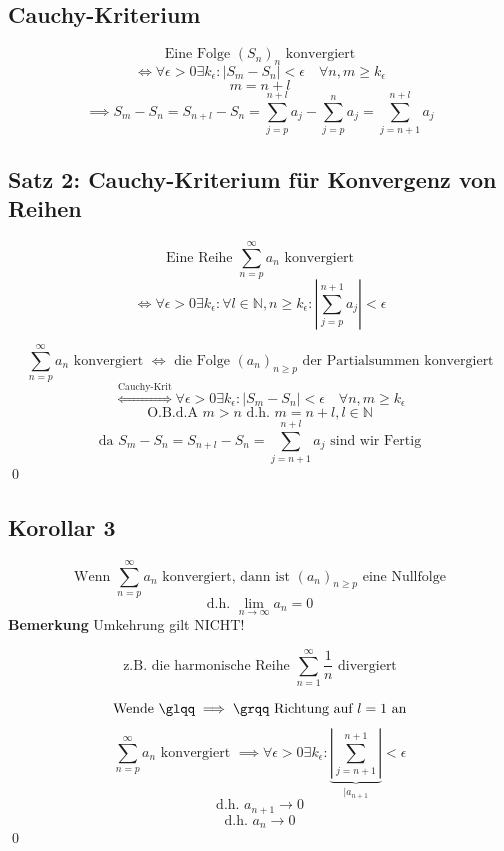 \documentclass[fleqn]{scrbook}
\newcommand{\mqq}[1]{\text{\glqq} #1\text{\grqq}}
\renewenvironment{proof}{{\bfseries Beweis }}{\qed}
\begin{document}
\subsection{Cauchy-Kriterium}

\[\text{Eine Folge } (S_n)_n \text{ konvergiert} \]
\[\Longleftrightarrow \forall \epsilon > 0 \exists k_\epsilon : |S_m -S_n|<\epsilon \quad \forall n,m \geq k_\epsilon\] 
\[m=n+l\]
\[\implies S_m - S_n = S_{n+l} - S_n = \sum_{j=p}^{n+l} a_j -\sum_{j=p}^n a_j = \sum_{j=n+1}^{n+l} a_j\]

\subsection{Satz 2: Cauchy-Kriterium für Konvergenz von Reihen}

\[\text{Eine Reihe } \sum_{n=p}^\infty a_n \text{ konvergiert} \]
\[\Longleftrightarrow \forall \epsilon > 0 \exists k_\epsilon : \forall l \in \mathbb{N}, n \geq k_\epsilon : \left|\sum_{j=p}^{n+1} a_j\right|<\epsilon\]

\begin{proof}
  \[\sum_{n=p}^\infty a_n \text{ konvergiert } \Longleftrightarrow \text{ die Folge } (a_n)_{n\geq p} \text{ der Partialsummen konvergiert}\]
  \[\stackrel{\text{Cauchy-Krit}}{\Longleftrightarrow} \forall \epsilon > 0 \exists k_\epsilon : | S_m -S_n | < \epsilon \quad \forall n,m \geq k_\epsilon\]
  \[\text{O.B.d.A } m>n \text{ d.h. } m=n+l,l\in \mathbb{N}\]
  \[\text{da } S_m-S_n = S_{n+l}- S_n = \sum_{j=n+1}^{n+l} a_j \text{ sind wir Fertig}\]
\end{proof}

\subsection{Korollar 3}

\[\text{Wenn } \sum_{n=p}^\infty a_n \text{ konvergiert, dann ist } (a_n)_{n \geq p} \text{ eine Nullfolge} \]
\[\text{d.h. } \lim_{n\to \infty} a_n = 0\]
\textbf{Bemerkung}
Umkehrung gilt NICHT!

\[\text{z.B. die harmonische Reihe } \sum_{n=1}^\infty \frac{1}{n} \text{ divergiert}\]

\begin{proof}
  \[\text{Wende } \mqq{\implies} \text{ Richtung auf } l=1 \text{ an}\]
  \[\sum_{n=p}^\infty a_n \text{ konvergiert } \implies \forall \epsilon > 0 \exists k_\epsilon : \underbrace{\left| \sum_{j=n+1}^{n+1} \right|}_{|a_{n+1}}<\epsilon\]
  \[\text{d.h. } a_{n+1} \to 0\]
  \[\text{d.h. } a_{n} \to 0\]
\end{proof}
\end{document}
